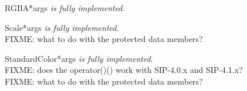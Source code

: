 \documentclass{manual}
\begin{document}
\begin{classdesc}{RGBA}{*args}
\emph{is fully implemented}.
\end{classdesc}

\begin{classdesc}{Scale}{*args}
\emph{is fully implemented}.\\
FIXME: what to do with the protected data members?
\end{classdesc}

\begin{classdesc}{StandardColor}{*args}
\emph{is fully implemented}.\\
FIXME: does the operator()() work with SIP-4.0.x and SIP-4.1.x?\\
FIXME: what to do with the protected data members?
\end{classdesc}
\end{document}
